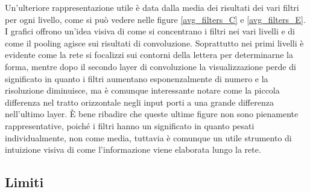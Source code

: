 \documentclass[a4paper,12pt]{article}
\begin{document}
Un'ulteriore rappresentazione utile è data dalla media dei risultati dei vari filtri per ogni livello, come si può vedere nelle figure \ref{avg_filters_C} e \ref{avg_filters_E}. I grafici offrono un'idea visiva di come si concentrano i filtri nei vari livelli e di come il pooling agisce sui risultati di convoluzione.
Soprattutto nei primi livelli è evidente come la rete si focalizzi sui contorni della lettera per determinarne la forma, mentre dopo il secondo layer di convoluzione la visualizzazione perde di significato in quanto i filtri aumentano esponenzalmente di numero e la risoluzione diminuisce, ma è comunque interessante notare come la piccola differenza nel tratto orizzontale negli input porti a una grande differenza nell'ultimo layer.
È bene ribadire che queste ultime figure non sono pienamente rappresentative, poiché i filtri hanno un significato in quanto pesati individualmente, non come media, tuttavia è comunque un utile strumento di intuizione visiva di come l'informazione viene elaborata lungo la rete.

\subsection{Limiti}

\end{document}
